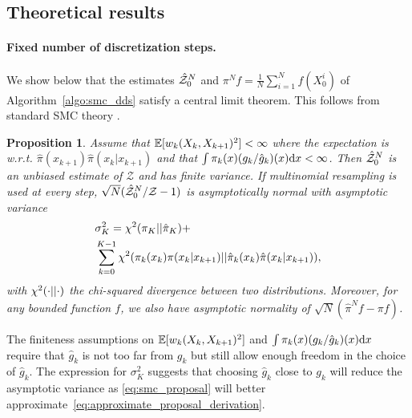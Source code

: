 \documentclass{article}
\theoremstyle{plain}
\newtheorem{proposition}[theorem]{Proposition}
\theoremstyle{definition}
\theoremstyle{remark}
\begin{document}
\subsection{Theoretical results}
\label{sec:theory}
\paragraph{Fixed number of discretization steps.} We show below that the estimates $\hat {\mathcal Z}^N_0$ and $\pi^N f=\tfrac{1}{N}\sum_{i=1}^N f(X^i_0)$ of Algorithm~\ref{algo:smc_dds} satisfy a central limit theorem. This follows from standard SMC theory \citep{del2004feynman,webber2019unifying}.
\begin{proposition}
	\label{prop:standard_smc}
	Assume that $\mathbb{E}[w_k(X_k, X_{k+1})^2] < \infty$ where the expectation is w.r.t. $\hat \pi(x_{k+1}) \hat\pi(x_k|x_{k+1})$ and that $\int \pi_k(x) (g_k/\hat g_k)(x) \mathrm{d} x < \infty$. Then $\hat {\mathcal Z}^N_0$ is an unbiased estimate of $\mathcal Z$ and has finite variance. If multinomial resampling is used at every step, $\sqrt N(\hat {\mathcal Z}^N_0 /\mathcal Z - 1)$ is asymptotically normal with asymptotic variance
	\begin{align*}
		 & \sigma_K^2 = \chi^2(\pi_K||\hat\pi_K) +                                                          \\
		 & \sum_{k=0}^{K-1} \chi^2(\pi_k(x_k)\pi(x_k|x_{k+1})||\hat \pi_{k}(x_{k}) \hat \pi(x_k|x_{k+1})) ,
	\end{align*}
	with $\chi^2(\cdot||\cdot)$ the chi-squared divergence between two distributions. Moreover, for any bounded function $f$, we also have asymptotic normality of $\sqrt N(\hat{\pi}^N f - \pi f)$.
\end{proposition}

The finiteness assumptions on $\mathbb{E}[w_k(X_k, X_{k+1})^2]$ and $\int \pi_k(x) (g_k/\hat g_k)(x) \mathrm{d} x$ require that $\hat g_k$ is not too far from $g_k$ but still allow enough freedom in the choice of $\hat g_k$. The expression for $\sigma_K^2$ suggests that choosing $\hat g_k$ close to $g_k$ will reduce the asymptotic variance as \eqref{eq:smc_proposal} will better approximate~\eqref{eq:approximate_proposal_derivation}.
\end{document}
